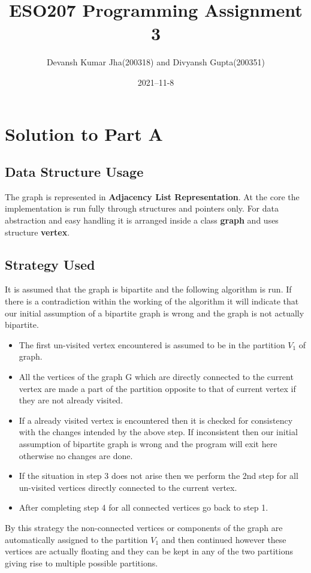 \documentclass[20pt]{article}
\title{ESO207 Programming Assignment 3}
\author{Devansh Kumar Jha(200318) and Divyansh Gupta(200351)}
\date{2021–11-8}
\begin{document}
\maketitle

\section{Solution to Part A}
\subsection{Data Structure Usage}
The graph is represented in \textbf{Adjacency List Representation}. At the core the implementation is run fully through structures and pointers only. For data abstraction and easy handling it is arranged inside a class \textbf{graph} and uses structure \textbf{vertex}.

\subsection{Strategy Used}
It is assumed that the graph is bipartite and the following algorithm is run. If there is a contradiction within the working of the algorithm it will indicate that our initial assumption of a bipartite graph is wrong and the graph is not actually bipartite.

\begin{itemize}
\item The first un-visited vertex encountered is assumed to be in the partition $V_1$ of graph.
\item All the vertices of the graph G which are directly connected to the current vertex are made a part of the partition opposite to that of current vertex if they are not already visited.
\item If a already visited vertex is encountered then it is checked for consistency with the changes intended by the above step. If inconsistent then our initial assumption of bipartite graph is wrong and the program will exit here otherwise no changes are done.
\item If the situation in step 3 does not arise then we perform the 2nd step for all un-visited vertices directly connected to the current vertex.
\item After completing step 4 for all connected vertices go back to step 1.
\end{itemize}

By this strategy the non-connected vertices or components of the graph are automatically assigned to the partition $V_1$ and then continued however these vertices are actually floating and they can be kept in any of the two partitions giving rise to multiple possible partitions.
\end{document}
